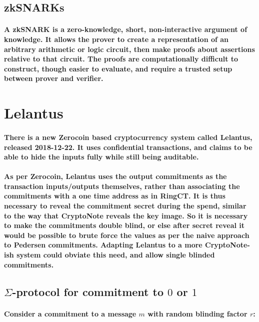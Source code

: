 \documentclass{article}
\begin{document}
\subsection{zkSNARKs}

\paragraph{A zkSNARK is a zero-knowledge, short, non-interactive argument of knowledge.  It allows the prover to create a representation of an arbitrary arithmetic or logic circuit, then make proofs about assertions relative to that circuit.  The proofs are computationally difficult to construct, though easier to evaluate, and require a trusted setup between prover and verifier.}



\section{Lelantus}

\paragraph{There is a new Zerocoin based cryptocurrency system called Lelantus, released 2018-12-22.  It uses confidential transactions, and claims to be able to hide the inputs fully while still being auditable.  }

\paragraph{As per Zerocoin, Lelantus uses the output commitments as the transaction inputs/outputs themselves, rather than associating the commitments with a one time address as in RingCT.  It is thus necessary to reveal the commitment secret during the spend, similar to the way that CryptoNote reveals the key image.  So it is necessary to make the commitments double blind, or else after secret reveal it would be possible to brute force the values as per the naive approach to Pedersen commitments.  Adapting Lelantus to a more CryptoNote-ish system could obviate this need, and allow single blinded commitments.}


\subsection{$\Sigma$-protocol for commitment to $0$ or $1$}

\paragraph{Consider a commitment to a message $m$ with random blinding factor $r$:}
\end{document}

